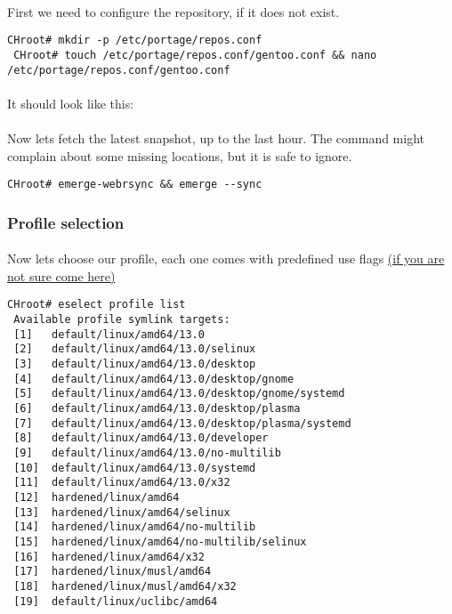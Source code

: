 \documentclass[10pt,a4paper]{article}
\begin{document}
                \paragraph{} First we need to configure the repository, if it does not exist.

\begin{lstlisting}[style=BashInputCHRoot]
 CHroot# mkdir -p /etc/portage/repos.conf
 CHroot# touch /etc/portage/repos.conf/gentoo.conf && nano /etc/portage/repos.conf/gentoo.conf
\end{lstlisting}

                \paragraph{} It should look like this:



                \paragraph{} Now lets fetch the latest snapshot, up to the last hour. The command might complain about some missing locations, but it is safe to ignore.

\begin{lstlisting}[style=BashInputCHRoot]
 CHroot# emerge-webrsync && emerge --sync
\end{lstlisting}

           \newpage
            \subsubsection{Profile selection}

                \paragraph{} Now lets choose our profile, each one comes with predefined use flags \href{https://wiki.gentoo.org/wiki/Handbook:PPC/Working/USE}{(if you are not sure come here)}

\begin{lstlisting}[style=BashInputCHRoot]
 CHroot# eselect profile list
 Available profile symlink targets:
 [1]   default/linux/amd64/13.0
 [2]   default/linux/amd64/13.0/selinux
 [3]   default/linux/amd64/13.0/desktop
 [4]   default/linux/amd64/13.0/desktop/gnome
 [5]   default/linux/amd64/13.0/desktop/gnome/systemd
 [6]   default/linux/amd64/13.0/desktop/plasma
 [7]   default/linux/amd64/13.0/desktop/plasma/systemd
 [8]   default/linux/amd64/13.0/developer
 [9]   default/linux/amd64/13.0/no-multilib
 [10]  default/linux/amd64/13.0/systemd
 [11]  default/linux/amd64/13.0/x32
 [12]  hardened/linux/amd64
 [13]  hardened/linux/amd64/selinux
 [14]  hardened/linux/amd64/no-multilib
 [15]  hardened/linux/amd64/no-multilib/selinux
 [16]  hardened/linux/amd64/x32
 [17]  hardened/linux/musl/amd64
 [18]  hardened/linux/musl/amd64/x32
 [19]  default/linux/uclibc/amd64
\end{lstlisting}
\end{document}

